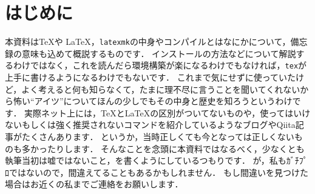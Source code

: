 \documentclass[./main]{subfiles}
\begin{document}
\section{はじめに}
\noindent
本資料は\TeX や \LaTeX ，\verb|latexmk|の中身やコンパイルとはなにかについて，備忘録の意味も込めて概説するものです．
インストールの方法などについて解説するわけではなく，これを読んだら環境構築が楽になるわけでもなければ，\verb|tex|が上手に書けるようになるわけでもないです．
これまで気にせずに使っていたけど，よく考えると何も知らなくて，たまに理不尽に言うことを聞いてくれないから怖い``アイツ''についてほんの少しでもその中身と歴史を知ろうというわけです．
実際ネット上には，\TeX と\LaTeX の区別がついてないものや，使ってはいけないもしくは強く推奨されないコマンドを紹介しているようなブログやQiita記事がたくさんあります．
というか，当時正しくても今となっては正しくないものも多かったりします．
そんなことを念頭に本資料ではなるべく，少なくとも執筆当初は嘘ではないこと，を書くようにしているつもりです．
が，私もｶﾞﾁﾌﾟﾛではないので，間違えてることもあるかもしれません．
もし間違いを見つけた場合はお近くの私までご連絡をお願いします．


\ifSubfilesClassLoaded{%
  \printbibliography
}{}
\end{document}
